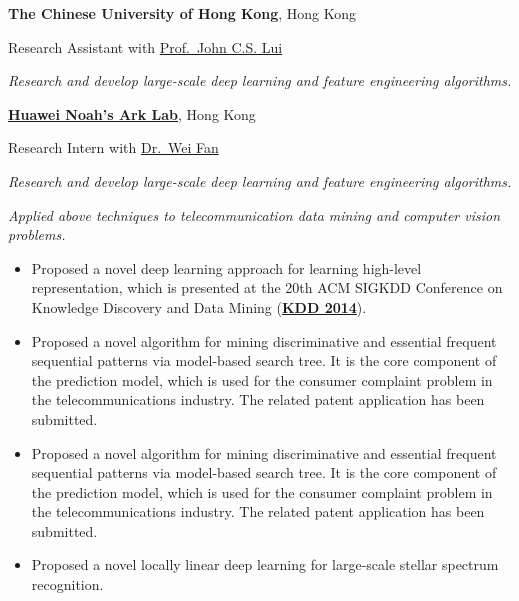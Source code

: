 \documentclass[]{article}
\renewenvironment{description}{
  \begin{basedescript}{\desclabelstyle{\pushlabel}\desclabelwidth{10em}}
}{
  \end{basedescript}
}
\begin{document}
\begin{description}
\item[05/2013 - present]
\textbf{The Chinese University of Hong Kong}, Hong Kong

Research Assistant with \href{http://www.cs.cuhk.hk/~cslui/}{Prof.~John
C.S. Lui}

\emph{Research and develop large-scale deep learning and feature
engineering algorithms.}
\item[05/2013 - present]
\href{http://www.noahlab.com.hk/}{\textbf{Huawei Noah's Ark Lab}}, Hong
Kong

Research Intern with \href{http://www.weifan.info/}{Dr.~Wei Fan}

\emph{Research and develop large-scale deep learning and feature
engineering algorithms.}

\emph{Applied above techniques to telecommunication data mining and
computer vision problems.}

\begin{itemize}
\itemsep1pt\parskip0pt
\item
  \small Proposed a novel deep learning approach for learning high-level
  representation, which is presented at the 20th ACM SIGKDD Conference
  on Knowledge Discovery and Data Mining
  (\href{http://www.kdd.org/kdd2014/}{\textbf{KDD 2014}}).
\end{itemize}

\begin{itemize}
\itemsep1pt\parskip0pt
\item
  \small Proposed a novel algorithm for mining discriminative and
  essential frequent sequential patterns via model-based search tree. It
  is the core component of the prediction model, which is used for the
  consumer complaint problem in the telecommunications industry. The
  related patent application has been submitted.
\end{itemize}

\begin{itemize}
\itemsep1pt\parskip0pt
\item
  \small Proposed a novel algorithm for mining discriminative and
  essential frequent sequential patterns via model-based search tree. It
  is the core component of the prediction model, which is used for the
  consumer complaint problem in the telecommunications industry. The
  related patent application has been submitted.
\end{itemize}

\begin{itemize}
\itemsep1pt\parskip0pt
\item
  \small Proposed a novel locally linear deep learning for large-scale
  stellar spectrum recognition.
\end{itemize}
\end{description}
\end{document}
